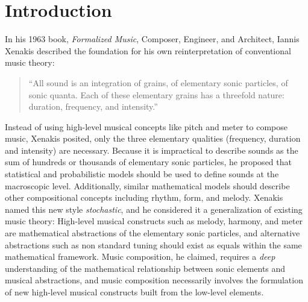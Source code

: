 \clearpage
\chapter{Introduction}
\label{ch:introduction}
In his 1963 book, \textit{Formalized Music}, Composer, Engineer, and
Architect, Iannis Xenakis described the foundation for his own
reinterpretation of conventional music theory:
\begin{quotation}
  ``All sound is an integration of grains, of elementary sonic
  particles, of sonic quanta. Each of these elementary grains has a
  threefold nature: duration, frequency, and intensity.''
\end{quotation}
Instead of using high-level musical concepts like pitch and meter to
compose music, Xenakis posited, only the three elementary qualities
(frequency, duration and intensity) are necessary. Because it is
impractical to describe sounds as the sum of hundreds or thousands of
elementary sonic particles, he proposed that statistical and probabilistic
models should be used to define sounds at the macroscopic
level. Additionally, similar mathematical models should describe other
compositional concepts including rhythm, form, and melody. Xenakis
named this new style \textit{stochastic}, and he considered it a
generalization of existing music theory: High-level musical constructs
such as melody, harmony, and meter are mathematical abstractions of
the elementary sonic particles, and alternative abstractions such as
non standard tuning should exist as equals within the same mathematical
framework. Music composition, he claimed, requires a \emph{deep}
understanding of the mathematical relationship between sonic elements
and musical abstractions, and music composition necessarily involves
the formulation of new high-level musical constructs built from the
low-level elements.

